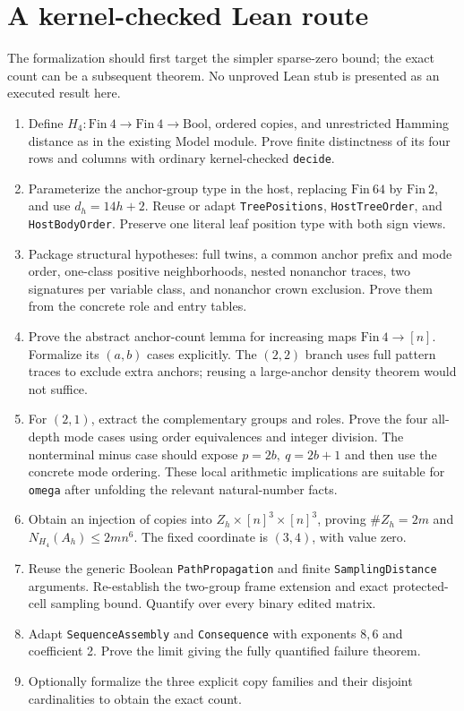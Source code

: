 \documentclass[11pt,a4paper]{article}
\theoremstyle{remark}
\newcommand{\Hfour}{H_4}
\begin{document}
\section{A kernel-checked Lean route}
\label{sec:lean}
The formalization should first target the simpler sparse-zero bound;
the exact count can be a subsequent theorem. No unproved Lean stub
is presented as an executed result here.
\begin{enumerate}
\item Define \(\Hfour:\mathrm{Fin}\ 4\to\mathrm{Fin}\ 4\to
\mathrm{Bool}\), ordered copies, and unrestricted Hamming distance
as in the existing Model module. Prove finite distinctness of its
four rows and columns with ordinary kernel-checked \texttt{decide}.
\item Parameterize the anchor-group type in the host, replacing
\(\mathrm{Fin}\ 64\) by \(\mathrm{Fin}\ 2\), and use
\(d_h=14h+2\). Reuse or adapt \texttt{TreePositions},
\texttt{HostTreeOrder}, and \texttt{HostBodyOrder}. Preserve one
literal leaf position type with both sign views.
\item Package structural hypotheses: full twins, a common anchor
prefix and mode order, one-class positive neighborhoods, nested
nonanchor traces, two signatures per variable class, and nonanchor
crown exclusion. Prove them from the concrete role and entry tables.
\item Prove the abstract anchor-count lemma for increasing maps
\(\mathrm{Fin}\ 4\to[n]\). Formalize its \((a,b)\) cases explicitly.
The \((2,2)\) branch uses full pattern traces to exclude extra
anchors; reusing a large-anchor density theorem would not suffice.
\item For \((2,1)\), extract the complementary groups and roles.
Prove the four all-depth mode cases using order equivalences and
integer division. The nonterminal minus case should expose
\(p=2b,\ q=2b+1\) and then use the concrete mode ordering.
These local arithmetic implications are suitable for
\texttt{omega} after unfolding the relevant natural-number facts.
\item Obtain an injection of copies into
\(Z_h\times[n]^3\times[n]^3\), proving
\(\#Z_h=2m\) and \(N_{\Hfour}(A_h)\le2mn^6\).
The fixed coordinate is \((3,4)\), with value zero.
\item Reuse the generic Boolean \texttt{PathPropagation} and
finite \texttt{SamplingDistance} arguments. Re-establish the
two-group frame extension and exact protected-cell sampling
bound. Quantify over every binary edited matrix.
\item Adapt \texttt{SequenceAssembly} and \texttt{Consequence}
with exponents \(8,6\) and coefficient 2. Prove the limit giving
the fully quantified failure theorem.
\item Optionally formalize the three explicit copy families and
their disjoint cardinalities to obtain the exact count.
\end{enumerate}
\end{document}
